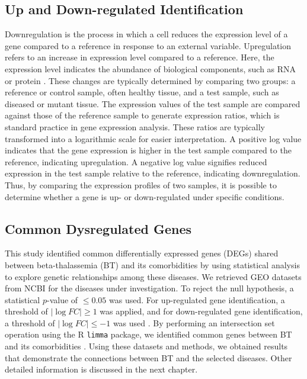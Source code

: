\subsection{Up and Down-regulated Identification}
\label{sec:sec3_4_6}

Downregulation is the process in which a cell reduces the expression level of a gene compared to a reference in response to an external variable. Upregulation refers to an increase in expression level compared to a reference. Here, the expression level indicates the abundance of biological components, such as RNA or protein \cite{b33}. These changes are typically determined by comparing two groups: a reference or control sample, often healthy tissue, and a test sample, such as diseased or mutant tissue. The expression values of the test sample are compared against those of the reference sample to generate expression ratios, which is standard practice in gene expression analysis. These ratios are typically transformed into a logarithmic scale for easier interpretation. A positive log value indicates that the gene expression is higher in the test sample compared to the reference, indicating upregulation. A negative log value signifies reduced expression in the test sample relative to the reference, indicating downregulation. Thus, by comparing the expression profiles of two samples, it is possible to determine whether a gene is up- or down-regulated under specific conditions.


\vspace*{-\parskip}
\subsection{Common Dysregulated Genes}
\label{sec:common_degs}

This study identified common differentially expressed genes (DEGs) shared between beta-thalassemia (BT) and its comorbidities by using statistical analysis to explore genetic relationships among these diseases. We retrieved GEO datasets from NCBI for the diseases under investigation. To reject the null hypothesis, a statistical \( p \)-value of \( \leq 0.05 \) was used. For up-regulated gene identification, a threshold of \( |\log FC| \geq 1 \) was applied, and for down-regulated gene identification, a threshold of \( |\log FC| \leq -1 \) was used \cite{b11}. By performing an intersection set operation using the R \texttt{limma} package, we identified common genes between BT and its comorbidities \cite{b27}. Using these datasets and methods, we obtained results that demonstrate the connections between BT and the selected diseases. Other detailed information is discussed in the next chapter.


